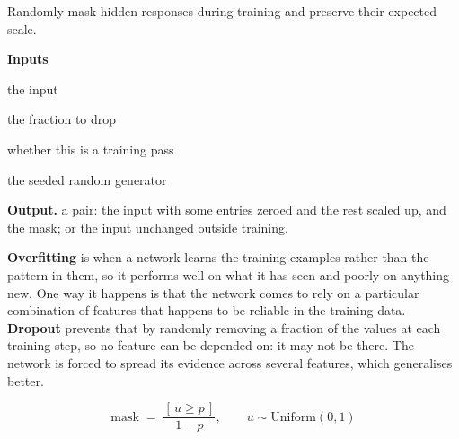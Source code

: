 Randomly mask hidden responses during training and preserve their expected scale.




\noindent\textbf{Inputs}
\begin{description}[leftmargin=2.2em,style=nextline,font=\normalfont\ttfamily]\setlength\itemsep{1pt}
  \item[{x}] \normalfont the input
  \item[{p}] \normalfont the fraction to drop
  \item[{training}] \normalfont whether this is a training pass
  \item[{rng}] \normalfont the seeded random generator
\end{description}

\noindent\textbf{Output.} a pair: the input with some entries zeroed and the rest scaled up, and the mask; or the input unchanged outside training.


\textbf{Overfitting} is when a network learns the training examples rather than the pattern in them, so it performs well on what it has seen and poorly on anything new. One way it happens is that the network comes to rely on a particular combination of features that happens to be reliable in the training data. \textbf{Dropout} \cite{srivastava2014} prevents that by randomly removing a fraction of the values at each training step, so no feature can be depended on: it may not be there. The network is forced to spread its evidence across several features, which generalises better.



\begin{equation}
\mathrm{mask} \;=\; \frac{[\,u \ge p\,]}{1 - p}, \qquad u \sim \mathrm{Uniform}(0,1)
\end{equation}

